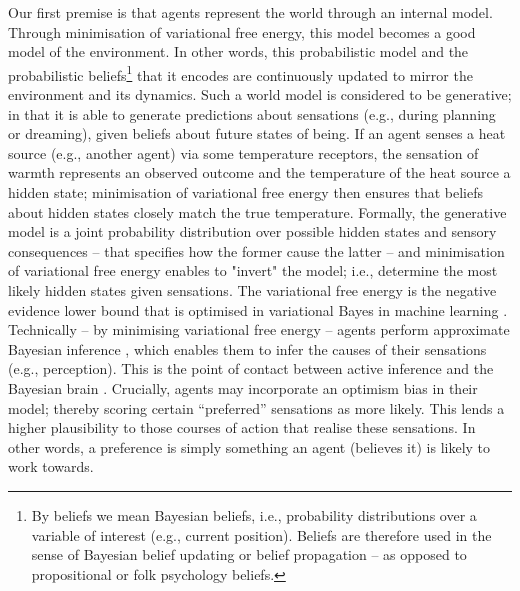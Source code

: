 \documentclass{article}
\begin{document}
Our first premise is that agents represent the world through an internal model. Through minimisation of variational free energy, this model becomes a good model of the environment. In other words, this probabilistic model and the probabilistic beliefs\footnote{By beliefs we mean Bayesian beliefs, i.e., probability distributions over a variable of interest (e.g., current position). Beliefs are therefore used in the sense of Bayesian belief updating or belief propagation – as opposed to propositional or folk psychology beliefs.} that it encodes are continuously updated to mirror the environment and its dynamics. Such a world model is considered to be generative; in that it is able to generate predictions about sensations (e.g., during planning or dreaming), given beliefs about future states of being. If an agent senses a heat source (e.g., another agent) via some temperature receptors, the sensation of warmth represents an observed outcome and the temperature of the heat source a hidden state; minimisation of variational free energy then ensures that beliefs about hidden states closely match the true temperature. Formally, the generative model is a joint probability distribution over possible hidden states and sensory consequences – that specifies how the former cause the latter -- and minimisation of variational free energy enables to "invert" the model; i.e., determine the most likely hidden states given sensations. The variational free energy is the negative evidence lower bound that is optimised in variational Bayes in machine learning \cite{bishopPatternRecognitionMachine2006,xitongUnderstandingVariationalLower2017}. Technically – by minimising variational free energy – agents perform approximate Bayesian inference \cite{senguptaApproximateBayesianInference2016,senguptaNeuronalGaugeTheory2016}, which enables them to infer the causes of their sensations (e.g., perception). This is the point of contact between active inference and the Bayesian brain \cite{aitchisonYouPredictiveCoding2017,fristonHistoryFutureBayesian2012,knillBayesianBrainRole2004}. Crucially, agents may incorporate an optimism bias \cite{mckayEvolutionMisbelief2009,sharotOptimismBias2011} in their model; thereby scoring certain “preferred” sensations as more likely. This lends a higher plausibility to those courses of action that realise these sensations. In other words, a preference is simply something an agent (believes it) is likely to work towards.
\end{document}
